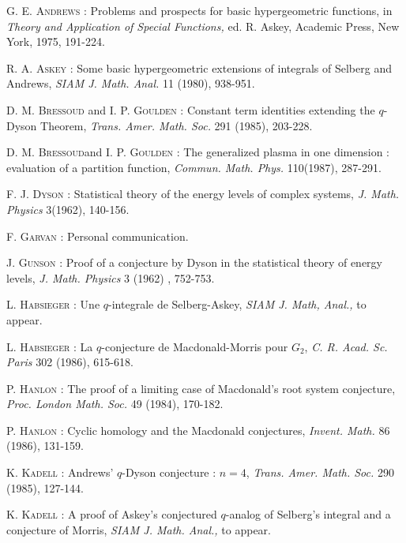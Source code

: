 \begin{thebibliography}{99}
 \textsc{G. E. Andrews} : Problems and prospects for basic hypergeometric functions, in \textit{Theory and Application of Special Functions,} ed. R. Askey, Academic Press, New York, 1975, 191-224.

 \textsc{R. A. Askey} : Some basic hypergeometric extensions of integrals of Selberg and Andrews, \textit{SIAM J. Math. Anal.} 11 (1980), 938-951.

 \textsc{D. M. Bressoud} and \textsc{I. P. Goulden} : Constant term identities extending the $q$-Dyson Theorem, \textit{Trans. Amer. Math. Soc.} 291 (1985), 203-228.

 \textsc{D. M. Bressoud}\pageoriginale and \textsc{I. P. Goulden} : The generalized plasma in one dimension : evaluation of a partition function, \textit{Commun. Math. Phys.} 110(1987), 287-291.

 \textsc{F. J. Dyson} : Statistical theory of the energy levels of complex systems, \textit{J. Math. Physics} 3(1962), 140-156.

 \textsc{F. Garvan} : Personal communication.

 \textsc{J. Gunson} : Proof of a conjecture by Dyson in the statistical theory of energy levels, \textit{J. Math. Physics} 3 (1962) , 752-753.

 \textsc{L. Habsieger} : Une $q$-integrale de Selberg-Askey, \textit{SIAM J. Math, Anal.,} to appear.

 \textsc{L. Habsieger} : La $q$-conjecture de Macdonald-Morris pour $G_2$, \textit{C. R. Acad. Sc. Paris} 302 (1986), 615-618.

 \textsc{P. Hanlon} : The proof of a limiting case of Macdonald's root system conjecture, \textit{Proc. London Math. Soc.} 49 (1984), 170-182.

 \textsc{P. Hanlon} : Cyclic homology and the Macdonald conjectures, \textit{Invent. Math.} 86 (1986), 131-159.

 \textsc{K. Kadell} : Andrews' $q$-Dyson conjecture : $n=4$, \textit{Trans. Amer. Math. Soc.} 290 (1985), 127-144.

 \textsc{K. Kadell} : A proof of Askey's conjectured $q$-analog of Selberg's integral and a conjecture of Morris, \textit{SIAM J. Math. Anal.,}  to appear. 


\end{thebibliography}
